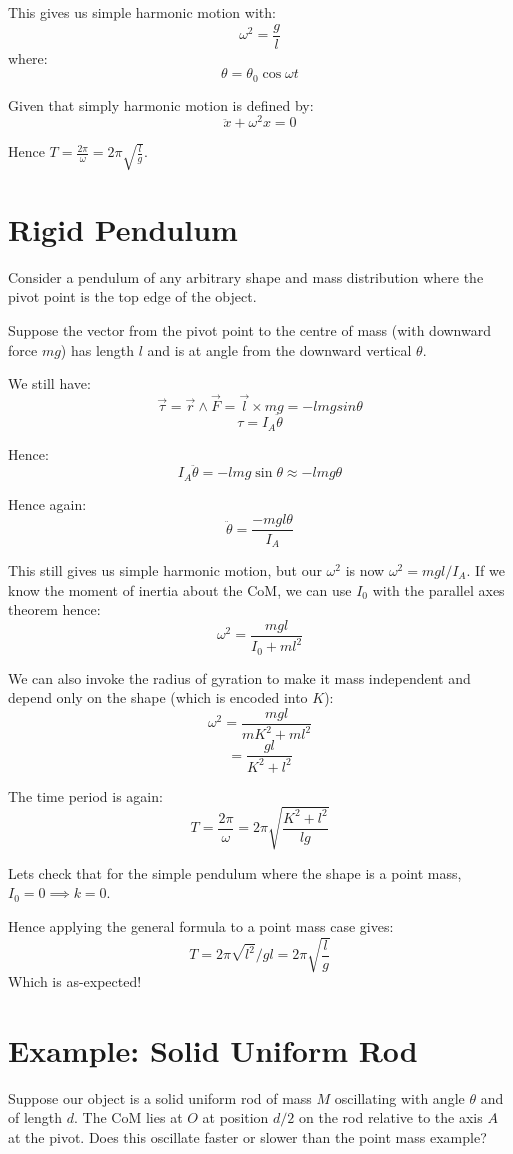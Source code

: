 This gives us simple harmonic motion with:
\[
    \omega^2 = \frac{g}{l}
\]
where:
\[
    \theta = \theta_0 \cos \omega t
\]

Given that simply harmonic motion is defined by:
\[
    \ddot{x} + \omega^2 x = 0
\]

Hence $T = \frac{2 \pi}{\omega} = 2 \pi \sqrt{\frac{l}{g}}$.

\section{Rigid Pendulum}
Consider a pendulum of any arbitrary shape and mass distribution where the pivot point is the top edge of the object.

Suppose the vector from the pivot point to the centre of mass (with downward force $mg$) has length $l$ and is at angle from the downward vertical $\theta$.

We still have:
\[
    \vec{\tau} = \vec{r} \wedge \vec{F} = \vec{l} \times mg = -lmg sin \theta
\]
\[
    \tau = I_A \ddot{\theta}
\]

Hence:
\[
    I_A \ddot{\theta} = -lmg \sin \theta \approx - l m g \theta
\]

Hence again:
\[
    \ddot{\theta} = \frac{-mgl \theta}{I_A}
\]

This still gives us simple harmonic motion, but our $\omega^2$ is now $\omega^2 = mgl/I_A$. If we know the moment of inertia about the CoM, we can use $I_0$ with the parallel axes theorem hence:
\[
    \omega^2 = \frac{mgl}{I_0 + ml^2}
\]

We can also invoke the radius of gyration to make it mass independent and depend only on the shape (which is encoded into $K$):
\[
    \omega^2 = \frac{mgl}{mK^2 + ml^2}
\]
\[
    = \frac{gl}{K^2 + l^2}
\]

The time period is again:
\[
    T = \frac{2 \pi}{\omega} = 2 \pi \sqrt{\frac{K^2+l^2}{lg}}
\]

Lets check that for the simple pendulum where the shape is a point mass, $I_0 = 0 \implies k = 0$.

Hence applying the general formula to a point mass case gives:
\[
    T = 2 \pi \sqrt{l^2} / gl = 2 \pi \sqrt{\frac{l}{g}}
\]
Which is as-expected!

\section{Example: Solid Uniform Rod}
Suppose our object is a solid uniform rod of mass $M$ oscillating with angle $\theta$ and of length $d$. The CoM lies at $O$ at position $d/2$ on the rod relative to the axis $A$ at the pivot. Does this oscillate faster or slower than the point mass example?

